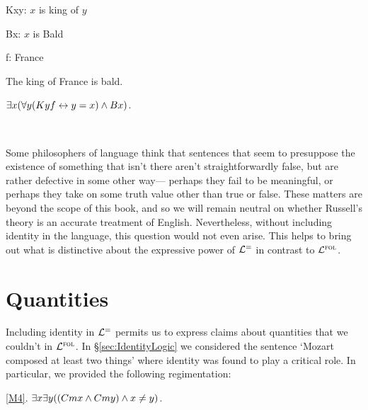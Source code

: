 \begin{multicols}{2}

\begin{ekey}
  \item[Kxy:] $x$ is king of $y$
  \item[Bx:] $x$ is Bald
  \item[f:] France
\end{ekey}

\begin{earg}
  \item[\ex{Def4}] The king of France is bald.
  \item[\ex{Def5}] $\exists x (\forall y (Kyf \leftrightarrow y = x) \wedge Bx)$.
  \item[] ~
\end{earg}

\end{multicols}

Some philosophers of language think that sentences that seem to presuppose the existence of something that isn't there aren't straightforwardly false, but are rather defective in some other way--- perhaps they fail to be meaningful, or perhaps they take on some truth value other than true or false.
These matters are beyond the scope of this book, and so we will remain neutral on whether Russell's theory is an accurate treatment of English.
Nevertheless, without including identity in the language, this question would not even arise.
This helps to bring out what is distinctive about the expressive power of $\mathcal{L}^{=}$ in contrast to $\mathcal{L}^{\textsc{fol}}$. 







\section{Quantities}
  \label{sec:Quantities}

Including identity in $\mathcal{L}^{=}$ permits us to express claims about quantities that we couldn't in $\mathcal{L}^{\textsc{fol}}$.
In \S\ref{sec:IdentityLogic} we considered the sentence `Mozart composed at least two things' where identity was found to play a critical role.
In particular, we provided the following regimentation:

\begin{earg}
  \item[\ref{M4}.] $\exists x\exists y((Cmx \wedge Cmy) \wedge x\neq y)$.
\end{earg}

